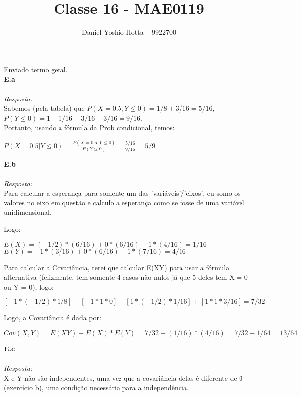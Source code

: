 \documentclass{article}
\begin{document}
	
	\title{Classe 16 - MAE0119}
	\author{Daniel Yoshio Hotta – 9922700}
	
	\maketitle	
	
	Enviado termo geral.\\
	
	\textbf {E.a} 
	\\ \\
	\textit {Resposta:} \\
    
    Sabemos (pela tabela) que $P(X = 0.5, Y \leq 0) = 1/8 + 3/16 = 5/16$, $P(Y \leq 0) = 1 - 1/16 - 3/16 - 3/16 = 9/16$. \\
    
    Portanto, usando a fórmula da Prob condicional, temos:
    
    \begin{center}
    	$P(X = 0.5 | Y \leq 0) = \frac{P(X = 0.5, Y \leq 0)}{P(Y \leq 0)} = \frac{5/16}{9/16} = 5/9$
    \end{center}

    \textbf {E.b} 
    \\ \\
    \textit {Resposta:} \\
    
    Para calcular a esperança para somente um das 'variáveis'/'eixos', eu somo os valores no eixo em questão e calculo a esperança como se fosse de uma variável unidimensional.
    
    Logo:
    
    \begin{center}
    	$E(X) = (-1/2) * (6/16) + 0 * (6/16) + 1 * (4/16) = 1/16$\\
    	$E(Y) = -1 * (3/16) + 0 * (6/16) + 1 * (7/16) = 4/16$\\    	
    \end{center}
    
    Para calcular a Covariância, terei que calcular E(XY) para usar a fórmula alternativa (felizmente, tem somente 4 casos não nulos já que 5 deles tem X = 0 ou Y = 0), logo:
    
    \begin{center}
    	$[-1 * (-1/2) * 1/8] + [-1 * 1 * 0] + [1 * (-1/2) * 1/16] + [1 * 1 * 3/16] = 7/32$ 
    \end{center}

    Logo, a Covariância é dada por:
    
    \begin{center}
    	$Cov(X, Y) = E(XY) - E(X) * E(Y) = 7/32 - (1/16)*(4/16) = 7/32 - 1/64 = 13/64$
    \end{center}

    \textbf {E.c} 
    \\ \\
    \textit {Resposta:} \\
    
    X e Y não são independentes, uma vez que a covariância delas é diferente de 0 (exercício b), uma condição necessária para a independência.
\end{document}
